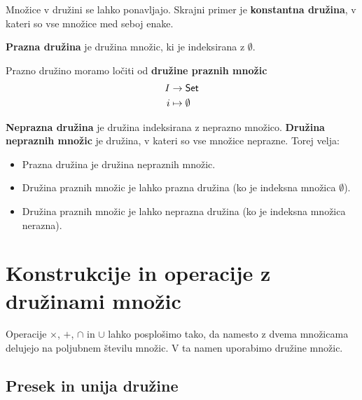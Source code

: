 \begin{primer}
  Množice v družini se lahko ponavljajo. Skrajni primer je \textbf{konstantna družina}, v kateri so vse množice med seboj enake.
\end{primer}

\begin{primer}
  \textbf{Prazna družina} je družina množic, ki je indeksirana z $\emptyset$.
\end{primer}

\begin{primer}
  Prazno družino moramo ločiti od \textbf{družine praznih množic}
  \begin{align*}
    I &\to \mathsf{Set} \\
    i &\mapsto \emptyset
  \end{align*}
\end{primer}

\begin{primer}
  \textbf{Neprazna družina} je družina indeksirana z neprazno množico.
  \textbf{Družina nepraznih množic} je družina, v kateri so vse množice neprazne.
  Torej velja:
  \begin{itemize}
  \item Prazna družina je družina nepraznih množic.
  \item Družina praznih množic je lahko prazna družina (ko je indeksna množica $\emptyset$).
  \item Družina praznih množic je lahko neprazna družina (ko je indeksna množica nerazna).
  \end{itemize}
\end{primer}


\section{Konstrukcije in operacije z družinami množic}

Operacije $\times$, $+$, $\cap$ in $\cup$ lahko posplošimo tako, da namesto z dvema
množicama delujejo na poljubnem številu množic. V ta namen uporabimo družine
množic.

\subsection{Presek in unija družine}

